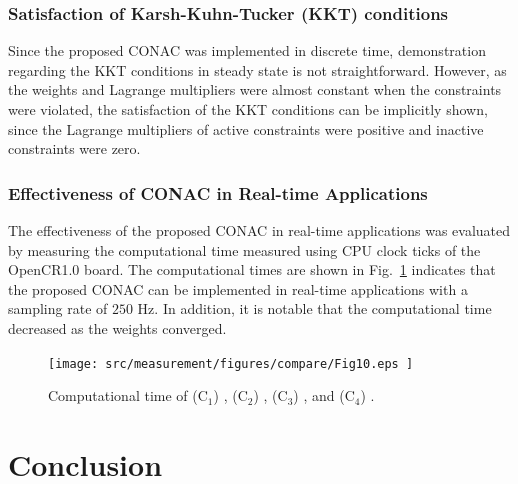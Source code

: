 \documentclass[lettersize,journal]{IEEEtran}
\begin{document}
\hfill
\subsubsection{Satisfaction of Karsh-Kuhn-Tucker (KKT) conditions}


Since the proposed CONAC was implemented in discrete time, demonstration regarding the KKT conditions in steady state is not straightforward.
However, as the weights and Lagrange multipliers were almost constant when the constraints were violated, the satisfaction of the KKT conditions can be implicitly shown, since the Lagrange multipliers of active constraints were positive and inactive constraints were zero.

\hfill
\subsubsection{Effectiveness of CONAC in Real-time Applications}

The effectiveness of the proposed CONAC in real-time applications was evaluated by measuring the computational time measured using CPU clock ticks of the OpenCR1.0 board.
The computational times are shown in Fig.~\ref{fig:ctrl:real:result:cmp:time} indicates that the proposed CONAC can be implemented in real-time applications with a sampling rate of $250$ Hz.
In addition, it is notable that the computational time decreased as the weights converged.

\begin{figure}[t]
    \centering
        \texttt{[image: 
            src/measurement/figures/compare/Fig10.eps
        ]}%
    \caption{
        Computational time of (C$_1$) \protect{}, (C$_2$) \protect{}, (C$_3$) \protect{}, and (C$_4$) \protect{}.
    }
    \label{fig:ctrl:real:result:cmp:time}
  \end{figure}

\section{Conclusion}\label{sec:conclusion}
\end{document}
